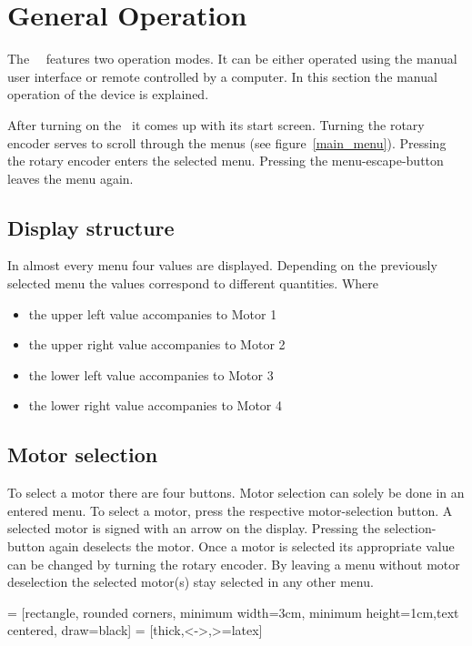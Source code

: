 \section{General Operation}
The \productNumber ~\productName ~features two operation modes. It can be
either operated using the manual user interface or remote controlled by a
computer. In this section the manual operation of the device is explained.

After turning on the \productName ~it comes up with its start screen.
Turning the rotary encoder serves to scroll through the menus (see
figure~\ref{main_menu}). Pressing the rotary encoder enters the selected
menu. Pressing the menu-escape-button leaves the menu again.

\subsection{Display structure}
In almost every menu four values are displayed. Depending on the previously
selected menu the values correspond to different quantities. Where
\begin{itemize}
  \item the upper left value accompanies to Motor 1
  \item the upper right value accompanies to Motor 2
  \item the lower left value accompanies to Motor 3
  \item the lower right value accompanies to Motor 4
\end{itemize}

\subsection{Motor selection}
To select a motor there are four buttons. Motor selection can solely be
done in an entered menu. To select a motor, press the respective motor-selection
button. A selected motor is signed with an arrow on the display. Pressing the
selection-button again deselects the motor. Once a motor is selected its
appropriate value can be changed by turning the rotary encoder. By leaving
a menu without motor deselection the selected motor(s) stay selected in any
other menu.

 = [rectangle, rounded corners, minimum width=3cm, minimum height=1cm,text centered, draw=black]
 = [thick,<->,>=latex]
\def \textWidth {5cm}


